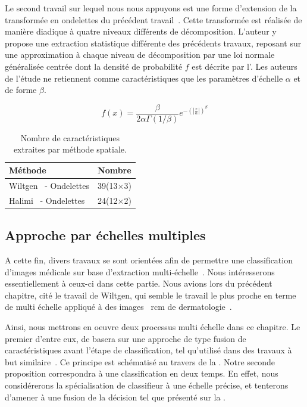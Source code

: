 Le second travail sur lequel nous nous appuyons est une forme d'extension de la transformée en ondelettes du précédent travail~\cite{Halimi2017a}. Cette transformée est réalisée de manière diadique à quatre niveaux différents de décomposition. L'auteur y propose une extraction statistique différente des précédents travaux, reposant sur une approximation à chaque niveau de décomposition par une loi normale généralisée centrée dont la densité de probabilité $f$ est décrite par l'. Les auteurs de l'étude ne retiennent comme caractéristiques que les paramètres d'échelle $\alpha$ et de forme $\beta$.\par
\begin{equation}
    f(x)= \frac{\beta}{2\alpha\Gamma(1/\beta)} e^{-\left(|\frac{x}{\alpha}|\right)^\beta}
    \label{eq:ggd}
\end{equation}

\begin{table}[h]
    \centering
    \begin{tabular*}{0.6\linewidth}{l@{\extracolsep{\fill}}l}
        \toprule
        \textbf{Méthode}                        & \textbf{Nombre}   \\ \hline
        Wiltgen~\cite{Wiltgen2008} - Ondelettes & 39(13$\times$3)   \\ \hline
        Halimi~\cite{Halimi2017a} - Ondelettes  & 24(12$\times$2)   \\
        \bottomrule
    \end{tabular*}
    \caption{Nombre de caractéristiques extraites par méthode spatiale.}
    \label{tab:number_features}
\end{table}\par

\subsection{Approche par échelles multiples}


A cette fin, divers travaux se sont orientées afin de permettre une classification d'images médicale sur base d'extraction multi-échelle~\cite{Alsaih2016,Tzalavra2016}. Nous intéresserons essentiellement à ceux-ci dans cette partie. Nous avions lors du précédent chapitre, cité le travail de Wiltgen, qui semble le travail le plus proche en terme de multi échelle appliqué à des images ~\gls{rcm} de dermatologie~\cite{Wiltgen2008}.\par

Ainsi, nous mettrons en oeuvre deux processus multi échelle dans ce chapitre. Le premier d'entre eux, de basera sur une approche de type fusion de caractéristiques avant l'étape de classification, tel qu'utilisé dans des travaux à but similaire~\cite{Pedersoli2011,Alsaih2016}. Ce principe est schématisé au travers de la . Notre seconde proposition correspondra à une classification en deux temps. En effet, nous considérerons la spécialisation de classifieur à une échelle précise, et tenterons d'amener à une fusion de la décision tel que présenté sur la .\par


